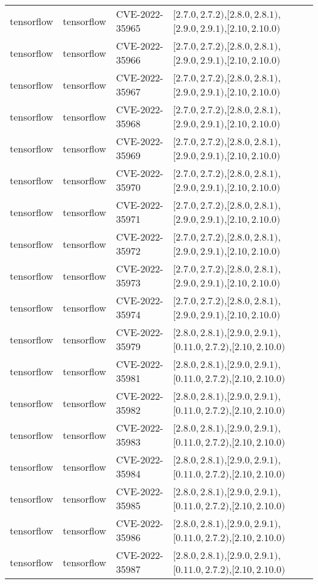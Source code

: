 \begin{tabular}{llll}
tensorflow & tensorflow & CVE-2022-35965 & $[2.7.0,2.7.2)$,$[2.8.0,2.8.1)$,$[2.9.0,2.9.1)$,$[2.10,2.10.0)$ \\
tensorflow & tensorflow & CVE-2022-35966 & $[2.7.0,2.7.2)$,$[2.8.0,2.8.1)$,$[2.9.0,2.9.1)$,$[2.10,2.10.0)$ \\
tensorflow & tensorflow & CVE-2022-35967 & $[2.7.0,2.7.2)$,$[2.8.0,2.8.1)$,$[2.9.0,2.9.1)$,$[2.10,2.10.0)$ \\
tensorflow & tensorflow & CVE-2022-35968 & $[2.7.0,2.7.2)$,$[2.8.0,2.8.1)$,$[2.9.0,2.9.1)$,$[2.10,2.10.0)$ \\
tensorflow & tensorflow & CVE-2022-35969 & $[2.7.0,2.7.2)$,$[2.8.0,2.8.1)$,$[2.9.0,2.9.1)$,$[2.10,2.10.0)$ \\
tensorflow & tensorflow & CVE-2022-35970 & $[2.7.0,2.7.2)$,$[2.8.0,2.8.1)$,$[2.9.0,2.9.1)$,$[2.10,2.10.0)$ \\
tensorflow & tensorflow & CVE-2022-35971 & $[2.7.0,2.7.2)$,$[2.8.0,2.8.1)$,$[2.9.0,2.9.1)$,$[2.10,2.10.0)$ \\
tensorflow & tensorflow & CVE-2022-35972 & $[2.7.0,2.7.2)$,$[2.8.0,2.8.1)$,$[2.9.0,2.9.1)$,$[2.10,2.10.0)$ \\
tensorflow & tensorflow & CVE-2022-35973 & $[2.7.0,2.7.2)$,$[2.8.0,2.8.1)$,$[2.9.0,2.9.1)$,$[2.10,2.10.0)$ \\
tensorflow & tensorflow & CVE-2022-35974 & $[2.7.0,2.7.2)$,$[2.8.0,2.8.1)$,$[2.9.0,2.9.1)$,$[2.10,2.10.0)$ \\
tensorflow & tensorflow & CVE-2022-35979 & $[2.8.0,2.8.1)$,$[2.9.0,2.9.1)$,$[0.11.0,2.7.2)$,$[2.10,2.10.0)$ \\
tensorflow & tensorflow & CVE-2022-35981 & $[2.8.0,2.8.1)$,$[2.9.0,2.9.1)$,$[0.11.0,2.7.2)$,$[2.10,2.10.0)$ \\
tensorflow & tensorflow & CVE-2022-35982 & $[2.8.0,2.8.1)$,$[2.9.0,2.9.1)$,$[0.11.0,2.7.2)$,$[2.10,2.10.0)$ \\
tensorflow & tensorflow & CVE-2022-35983 & $[2.8.0,2.8.1)$,$[2.9.0,2.9.1)$,$[0.11.0,2.7.2)$,$[2.10,2.10.0)$ \\
tensorflow & tensorflow & CVE-2022-35984 & $[2.8.0,2.8.1)$,$[2.9.0,2.9.1)$,$[0.11.0,2.7.2)$,$[2.10,2.10.0)$ \\
tensorflow & tensorflow & CVE-2022-35985 & $[2.8.0,2.8.1)$,$[2.9.0,2.9.1)$,$[0.11.0,2.7.2)$,$[2.10,2.10.0)$ \\
tensorflow & tensorflow & CVE-2022-35986 & $[2.8.0,2.8.1)$,$[2.9.0,2.9.1)$,$[0.11.0,2.7.2)$,$[2.10,2.10.0)$ \\
tensorflow & tensorflow & CVE-2022-35987 & $[2.8.0,2.8.1)$,$[2.9.0,2.9.1)$,$[0.11.0,2.7.2)$,$[2.10,2.10.0)$ \\

\end{tabular}
